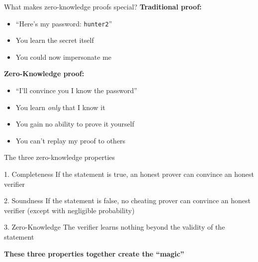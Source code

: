 \documentclass[aspectratio=169, lualatex, handout]{beamer}
\begin{document}
\begin{frame}{What makes zero-knowledge proofs special?}
	\textbf{Traditional proof:}
	\begin{itemize}
		\item ``Here's my password: \texttt{hunter2}''
		\item You learn the secret itself
		\item You could now impersonate me
	\end{itemize}
	\vspace{1em}
	\textbf{Zero-Knowledge proof:}
	\begin{itemize}
		\item ``I'll convince you I know the password''
		\item You learn \textit{only} that I know it
		\item You gain no ability to prove it yourself
		\item You can't replay my proof to others
	\end{itemize}
\end{frame}

\begin{frame}{The three zero-knowledge properties}
	\begin{block}{1. Completeness}
		If the statement is true, an honest prover can convince an honest verifier
	\end{block}
	\begin{block}{2. Soundness}
		If the statement is false, no cheating prover can convince an honest verifier (except with negligible probability)
	\end{block}
	\begin{block}{3. Zero-Knowledge}
		The verifier learns nothing beyond the validity of the statement
	\end{block}
	\vspace{0.25em}
	\begin{center}
		\textbf{These three properties together create the ``magic''}
	\end{center}
\end{frame}
\end{document}
